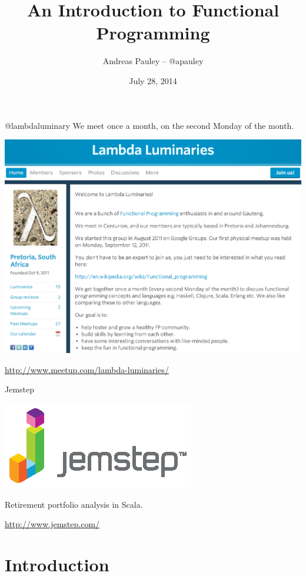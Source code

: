 \documentclass[mathserif]{beamer}
\title[Functional Programming]{An Introduction to Functional Programming}
\author{Andreas Pauley -- @apauley}
\institute{Jozi JUG}
\date{July 28, 2014}
\begin{document}
\begin{frame}
  \titlepage
\end{frame}

\begin{frame}{@lambdaluminary}
  We meet once a month, on the second Monday of the month.
  \begin{center}
    \includegraphics[scale=0.2]{img/ScreenShotLambdaLuminaries.png}
  \end{center}
  \url{http://www.meetup.com/lambda-luminaries/}
\end{frame}

\begin{frame}{Jemstep}
  \begin{center}
    \includegraphics[scale=2]{img/Jemstep_HD_RGB.eps}
  \end{center}

  Retirement portfolio analysis in Scala.

  \vskip5mm

  \url{http://www.jemstep.com/}
\end{frame}

\section{Introduction}
\end{document}
